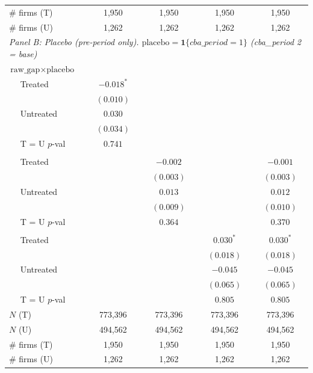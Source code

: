 \begin{table}[H]
\begin{tabular}{lcccc}
\# firms (T) & 1,950 & 1,950 & 1,950 & 1,950 \\
\# firms (U) & 1,262 & 1,262 & 1,262 & 1,262 \\
\midrule
\multicolumn{5}{l}{\textit{Panel B: Placebo (pre-period only). $\text{placebo} = \mathbf{1}\{cba\_period = 1\}$ (cba\_period 2 = base)}} \\
\midrule
\multicolumn{5}{l}{$\text{raw\_gap} \times \text{placebo}$} \\
$\quad$ Treated & $-0.018^{*}$ &  &  &  \\
 & $(0.010)$ &  &  &  \\
$\quad$ Untreated & $0.030$ &  &  &  \\
 & $(0.034)$ &  &  &  \\
$\quad$ T = U $p$-val & $0.741$ &  &  &  \\
\addlinespace[2pt]
\multicolumn{5}{l}{$\text{gap} \times \text{placebo}$} \\
$\quad$ Treated &  & $-0.002$ &  & $-0.001$ \\
 &  & $(0.003)$ &  & $(0.003)$ \\
$\quad$ Untreated &  & $0.013$ &  & $0.012$ \\
 &  & $(0.009)$ &  & $(0.010)$ \\
$\quad$ T = U $p$-val &  & $0.364$ &  & $0.370$ \\
\addlinespace[2pt]
\multicolumn{5}{l}{$\text{surplus} \times \text{placebo}$} \\
$\quad$ Treated &  &  & $0.030^{*}$ & $0.030^{*}$ \\
 &  &  & $(0.018)$ & $(0.018)$ \\
$\quad$ Untreated &  &  & $-0.045$ & $-0.045$ \\
 &  &  & $(0.065)$ & $(0.065)$ \\
$\quad$ T = U $p$-val &  &  & $0.805$ & $0.805$ \\
\addlinespace[2pt]
$N$ (T) & 773,396 & 773,396 & 773,396 & 773,396 \\
$N$ (U) & 494,562 & 494,562 & 494,562 & 494,562 \\
\# firms (T) & 1,950 & 1,950 & 1,950 & 1,950 \\
\# firms (U) & 1,262 & 1,262 & 1,262 & 1,262 \\
\bottomrule
\end{tabular}
\begin{minipage}{\linewidth}
\footnotesize\vspace{4pt}

\end{minipage}
\end{table}
